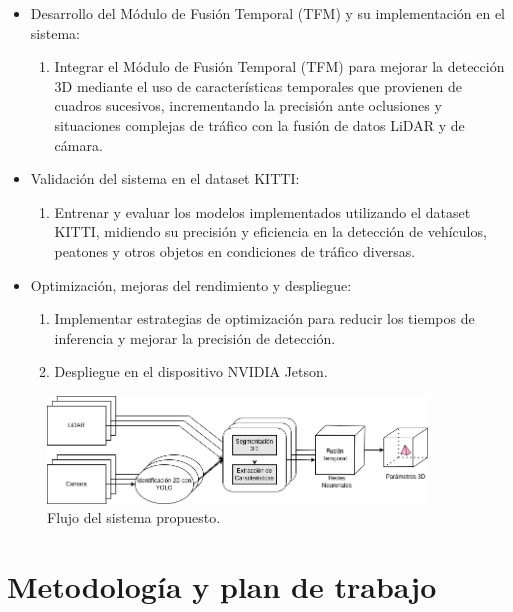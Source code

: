 \begin{itemize}
	\item Desarrollo del Módulo de Fusión Temporal (TFM) y su implementación en el sistema:
	\begin{enumerate}
		\item Integrar el Módulo de Fusión Temporal (TFM) para mejorar la detección 3D mediante el uso de características temporales que provienen de cuadros sucesivos, incrementando la precisión ante oclusiones y situaciones complejas de tráfico con la fusión de datos LiDAR y de cámara.
	\end{enumerate}
	
	\item Validación del sistema en el dataset KITTI:
	\begin{enumerate}
		\item Entrenar y evaluar los modelos implementados utilizando el dataset KITTI, midiendo su precisión y eficiencia en la detección de vehículos, peatones y otros objetos en condiciones de tráfico diversas.
	\end{enumerate}
	
	\item Optimización, mejoras del rendimiento y despliegue:
	\begin{enumerate}
		\item Implementar estrategias de optimización para reducir los tiempos de inferencia y mejorar la precisión de detección.
		\item Despliegue en el dispositivo NVIDIA Jetson.
	\end{enumerate}
	
\end{itemize}

\begin{figure}[hbtp]
	\centering
	\includegraphics[width=0.9\textwidth]{flujo.png}
	\caption{Flujo del sistema propuesto.}
	\label{fig:flujo_sistema}
\end{figure}



\section{Metodología y plan de trabajo}
\label{sec:metodologia-y-plan}

